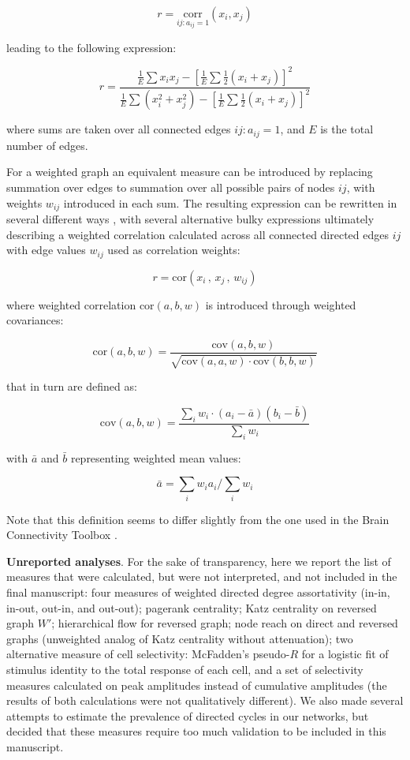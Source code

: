 \documentclass{article}
\begin{document}
\[ r=\underset{ij: a_{ij}=1}{\text{corr}}(x_i,x_j) \]

leading to the following expression:

\[ r = \frac{\frac{1}{E} \sum{x_i x_j} - [\frac{1}{E} \sum{\frac{1}{2}(x_i+x_j)}]^2} {\frac{1}{E} \sum{(x_i^2+x_j^2)}-[\frac{1}{E} \sum{\frac{1}{2}(x_i+x_j)}]^2} \]

where sums are taken over all connected edges $ij: a_{ij}=1$, and $E$ is the total number of edges.

For a weighted graph an equivalent measure can be introduced by replacing summation over edges to summation over all possible pairs of nodes $ij$, with weights $w_{ij}$ introduced in each sum. The resulting expression can be rewritten in several different ways \citep{newman2003mixing,leung2007weighted,farine2014weighted,teller2014assortative}, with several alternative bulky expressions ultimately describing a weighted correlation calculated across all connected directed edges $ij$ with edge values $w_{ij}$ used as correlation weights:

\[ r=\text{cor}(x_i \, , \, x_j \, , \, w_{ij}) \]

where weighted correlation $\text{cor}(a,b,w)$ is introduced through weighted covariances: 

\[ \text{cor}(a,b,w) = \frac{\text{cov}(a,b,w)}{\sqrt{\text{cov}(a,a,w) \cdot \text{cov}(b,b,w)}} \]

that in turn are defined as: 

\[ \text{cov}(a,b,w) = \frac{\sum_i{w_i \cdot (a_i-\bar{a})(b_i-\bar{b})}}{\sum_i{w_i}} \]

with $\bar{a}$ and $\bar{b}$ representing weighted mean values: 

\[ \bar{a}=\sum_i{w_i a_i}/\sum_i{w_i} \]

Note that this definition seems to differ slightly from the one used in the Brain Connectivity Toolbox \citep{rubinov2010toolbox}.

\textbf{Unreported analyses}. For the sake of transparency, here we report the list of measures that were calculated, but were not interpreted, and not included in the final manuscript: four measures of weighted directed degree assortativity (in-in, in-out, out-in, and out-out); pagerank centrality; Katz centrality on reversed graph $W'$; hierarchical flow for reversed graph; node reach on direct and reversed graphs (unweighted analog of Katz centrality without attenuation); two alternative measure of cell selectivity: McFadden’s pseudo-$R$ for a logistic fit of stimulus identity to the total response of each cell, and a set of selectivity measures calculated on peak amplitudes instead of cumulative amplitudes (the results of both calculations were not qualitatively different). We also made several attempts to estimate the prevalence of directed cycles in our networks, but decided that these measures require too much validation to be included in this manuscript.
\end{document}
